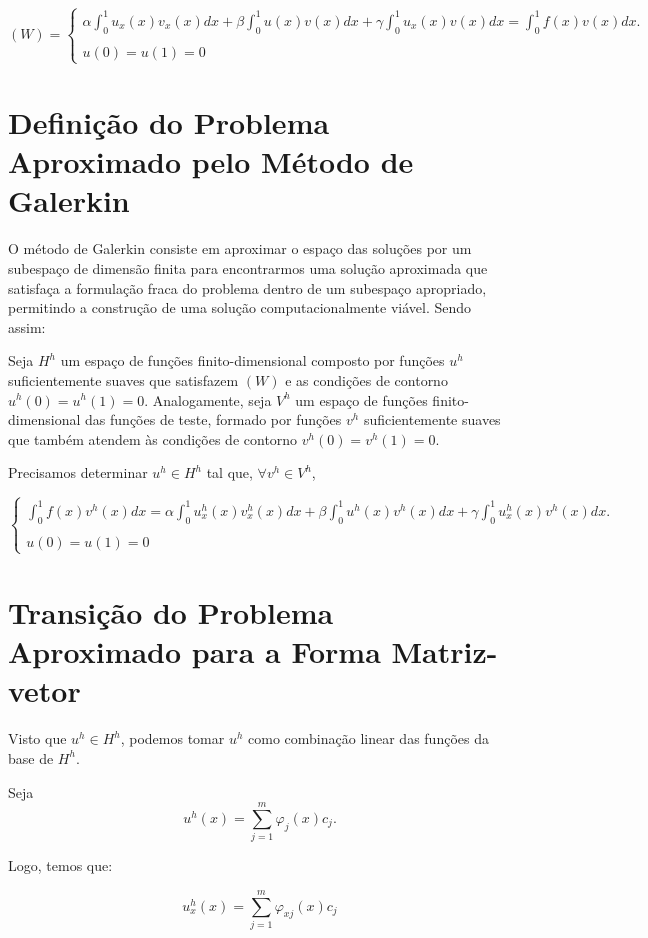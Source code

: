 \[(W) = \begin{cases} \alpha \displaystyle\int^{1}_{0} u_{x}(x)v_{x}(x) dx + \beta \int^{1}_{0} u(x)v(x) dx + \gamma \int^{1}_{0} u_{x}(x)v(x) dx = \int^{1}_{0} f(x)v(x) dx.\\
  \\
  u(0) = u(1) = 0
\end{cases}\]


\section{Definição do Problema Aproximado pelo Método de Galerkin}

O método de Galerkin consiste em aproximar o espaço das soluções por um subespaço de dimensão finita para encontrarmos uma solução aproximada que satisfaça a formulação fraca do problema dentro de um subespaço apropriado, permitindo a construção de uma solução computacionalmente viável. Sendo assim:

Seja $H^h$ um espaço de funções finito-dimensional composto por funções $u^h$ suficientemente suaves que satisfazem $(W)$ e as condições de contorno $u^h(0) = u^h(1) = 0$. Analogamente, seja $V^h$ um espaço de funções finito-dimensional das funções de teste, formado por funções $v^h$ suficientemente suaves que também atendem às condições de contorno $v^h(0) = v^h(1) = 0$.

Precisamos determinar $u^h \in H^h$ tal que, $\forall v^h \in V^h$,

\[\begin{cases} \displaystyle\int^{1}_{0} f(x)v^{h}(x) dx = \alpha \int^{1}_{0} u^{h}_{x}(x)v^{h}_{x}(x) dx + \beta \int^{1}_{0} u^{h}(x)v^{h}(x) dx + \gamma \int^{1}_{0} u^{h}_{x}(x)v^{h}(x) dx. \\
  \\
  u(0) = u(1) = 0
\end{cases}\]

\section{Transição do Problema Aproximado para a Forma Matriz-vetor}

Visto que $u^h \in H^h$, podemos tomar $u^h$ como combinação linear das funções da base de $H^h$.

Seja \[u^h(x) = \sum_{j=1}^{m} \varphi_j(x) c_j.\]

Logo, temos que:

\[u_{x}^h(x) = \sum_{j=1}^{m} \varphi_{xj}(x)c_j\]

